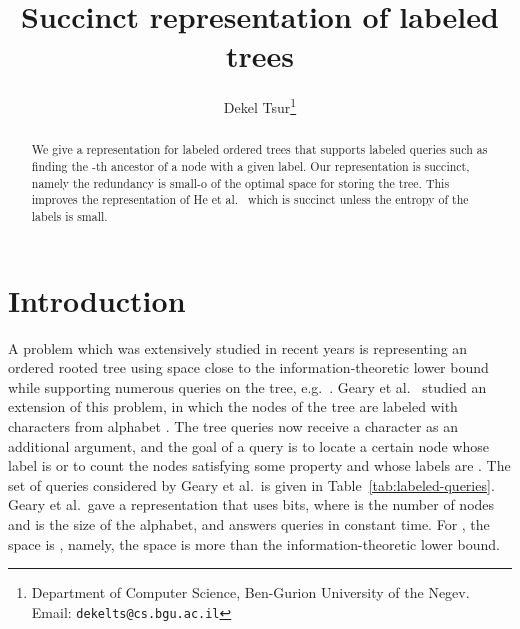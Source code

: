 \documentclass[12pt]{article}
\begin{document}
\title{Succinct representation of labeled trees}
\author{Dekel Tsur\thanks{Department of Computer Science, Ben-Gurion University of the Negev.
Email: \texttt{dekelts@cs.bgu.ac.il}}}
\date{}
\maketitle

\begin{abstract}
We give a representation for labeled ordered trees
that supports labeled queries such as finding the -th ancestor of a node
with a given label.
Our representation is succinct, namely the redundancy is
small-o of the optimal space for storing the tree.
This improves the representation of He et al.~\cite{HeMZ12} which is
succinct unless the entropy of the labels is small.
\end{abstract}

\section{Introduction}

A problem which was extensively studied in recent years is representing an ordered rooted
tree using space close to the information-theoretic lower bound
while supporting numerous queries on the tree, e.g.~\cite{Jacobson89,MunroR01,ChiangLL05,MunroRRR12,BenoitDMRRR05,GearyRR06,FarzanM08,NavarroS14}.
Geary et al.~\cite{GearyRR06} studied an extension of this problem, in which
the nodes of the tree are labeled with characters from alphabet .
The tree queries now receive a character  as an additional argument, and the
goal of a query is to locate a certain node whose label is  or to count
the nodes satisfying some property and whose labels are .
The set of queries considered by Geary et al.\ is given in
Table~\ref{tab:labeled-queries}.
Geary et al.\ gave a representation that uses
 bits,
where  is the number of nodes and  is the size of the alphabet,
and answers queries in constant time.
For , the space is
, namely, the space is  more than the
information-theoretic lower bound.
\end{document}
